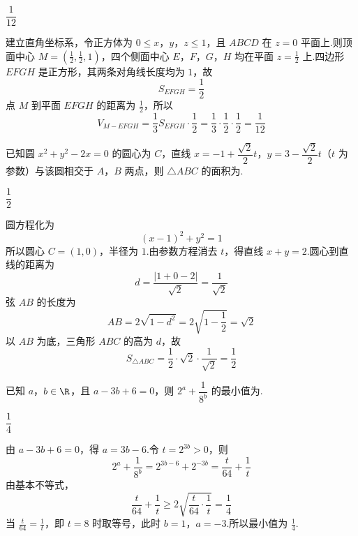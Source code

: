 \begin{answer}
\(\dfrac1{12}\)
\end{answer}

\begin{solution}
建立直角坐标系，令正方体为 \(0\le x\)，\(y\)，\(z\le1\)，且 \(ABCD\) 在 \(z=0\) 平面上.则顶面中心 \(M=(\frac12,\frac12,1)\)，四个侧面中心 \(E\)，\(F\)，\(G\)，\(H\) 均在平面 \(z=\frac12\) 上.四边形 \(EFGH\) 是正方形，其两条对角线长度均为 \(1\)，故
\[
S_{EFGH}=\frac12
\]
点 \(M\) 到平面 \(EFGH\) 的距离为 \(\frac12\)，所以
\[
V_{M-EFGH}=\frac13S_{EFGH}\cdot\frac12
=\frac13\cdot\frac12\cdot\frac12
=\frac1{12}
\]
\end{solution}

\begin{problem}
已知圆 \(x^2+y^2-2x=0\) 的圆心为 \(C\)，直线 \(x=-1+\dfrac{\sqrt2}{2}t\)，\(y=3-\dfrac{\sqrt2}{2}t\)（\(t\) 为参数）与该圆相交于 \(A\)，\(B\) 两点，则 \(\triangle ABC\) 的面积为\fillinblank{}.
\end{problem}

\begin{answer}
\(\dfrac12\)
\end{answer}

\begin{solution}
圆方程化为
\[
(x-1)^2+y^2=1
\]
所以圆心 \(C=(1,0)\)，半径为 \(1\).由参数方程消去 \(t\)，得直线 \(x+y=2\).圆心到直线的距离为
\[
d=\frac{|1+0-2|}{\sqrt2}=\frac1{\sqrt2}
\]
弦 \(AB\) 的长度为
\[
AB=2\sqrt{1-d^2}=2\sqrt{1-\frac12}=\sqrt2
\]
以 \(AB\) 为底，三角形 \(ABC\) 的高为 \(d\)，故
\[
S_{\triangle ABC}=\frac12\cdot\sqrt2\cdot\frac1{\sqrt2}=\frac12
\]
\end{solution}

\begin{problem}
已知 \(a\)，\(b\in\R\)，且 \(a-3b+6=0\)，则 \(2^a+\dfrac1{8^b}\) 的最小值为\fillinblank{}.
\end{problem}

\begin{answer}
\(\dfrac14\)
\end{answer}

\begin{solution}
由 \(a-3b+6=0\)，得 \(a=3b-6\).令 \(t=2^{3b}>0\)，则
\[
2^a+\frac1{8^b}
=2^{3b-6}+2^{-3b}
=\frac{t}{64}+\frac1t
\]
由基本不等式，
\[
\frac{t}{64}+\frac1t\ge2\sqrt{\frac{t}{64}\cdot\frac1t}=\frac14
\]
当 \(\frac{t}{64}=\frac1t\)，即 \(t=8\) 时取等号，此时 \(b=1\)，\(a=-3\).所以最小值为 \(\frac14\).
\end{solution}

